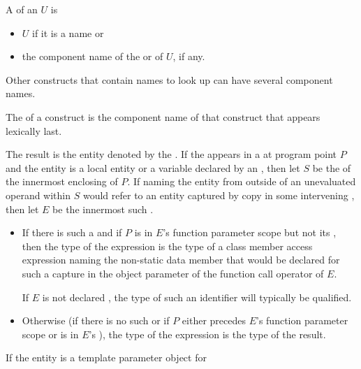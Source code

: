 \pnum
A  of an  $U$ is
\begin{itemize}
\item
$U$ if it is a name or
\item
the component name of
the  or  of $U$, if any.
\end{itemize}
\begin{note}
Other constructs that contain names to look up can have several
component names.
\end{note}
The  of a construct is
the component name of that construct that appears lexically last.

\pnum
The result is the entity denoted by
the .
If the  appears
in a  at program point $P$ and
the entity is a local entity or a variable declared by
an ,
then let $S$ be the  of
the innermost enclosing  of $P$.
If naming the entity from outside of an unevaluated operand within $S$
would refer to an entity
captured by copy in some intervening ,
then let $E$ be the innermost such .
\begin{itemize}
\item
If there is such a  and
if $P$ is in $E$'s function parameter scope
but not its , then
the type of the expression is
the type of a class member access expression
naming the non-static data member
that would be declared for such a capture
in the object parameter of the function call operator of $E$.
\begin{note}
If $E$ is not declared ,
the type of such an identifier will typically be  qualified.
\end{note}
\item
Otherwise (if there is no such  or
if $P$ either precedes $E$'s function parameter scope or
is in $E$'s ),
the type of the expression is the type of the result.
\end{itemize}
If the entity is a template parameter object for
